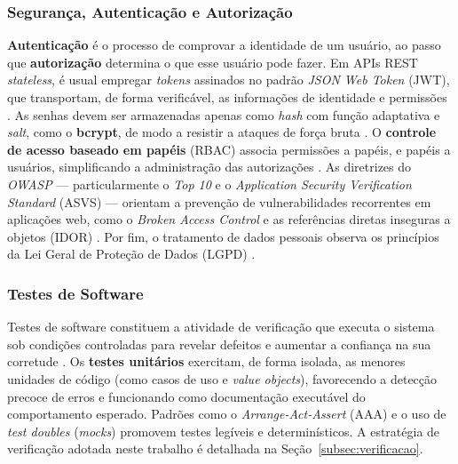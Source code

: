 \subsubsection{Segurança, Autenticação e Autorização}

\textbf{Autenticação} é o processo de comprovar a identidade de um usuário,
ao passo que \textbf{autorização} determina o que esse usuário pode fazer.
Em APIs REST \textit{stateless}, é usual empregar \textit{tokens} assinados no
padrão \textit{JSON Web Token} (JWT), que transportam, de forma verificável,
as informações de identidade e permissões \cite{rfc7519}. As senhas devem ser
armazenadas apenas como \textit{hash} com função adaptativa e \textit{salt},
como o \textbf{bcrypt}, de modo a resistir a ataques de força bruta
\cite{bcrypt}. O \textbf{controle de acesso baseado em papéis} (RBAC) associa
permissões a papéis, e papéis a usuários, simplificando a administração das
autorizações \cite{nistrbac}. As diretrizes do \textit{OWASP} ---
particularmente o \textit{Top 10} e o \textit{Application Security
Verification Standard} (ASVS) --- orientam a prevenção de vulnerabilidades
recorrentes em aplicações web, como o \textit{Broken Access Control} e as
referências diretas inseguras a objetos (IDOR) \cite{owasptop10, owaspasvs}.
Por fim, o tratamento de dados pessoais observa os princípios da Lei Geral de
Proteção de Dados (LGPD) \cite{lgpd}.

\subsubsection{Testes de Software}

Testes de software constituem a atividade de verificação que executa o sistema
sob condições controladas para revelar defeitos e aumentar a confiança na sua
corretude \cite{pressman2016, sommerville2011}. Os \textbf{testes unitários}
exercitam, de forma isolada, as menores unidades de código (como casos de uso
e \textit{value objects}), favorecendo a detecção precoce de erros e
funcionando como documentação executável do comportamento esperado. Padrões
como o \textit{Arrange-Act-Assert} (AAA) e o uso de \textit{test doubles}
(\textit{mocks}) promovem testes legíveis e determinísticos. A estratégia de
verificação adotada neste trabalho é detalhada na Seção~\ref{subsec:verificacao}.
